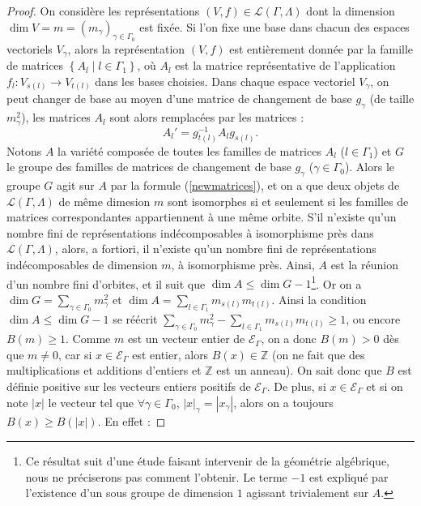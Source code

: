 \documentclass[a4paper,11pt]{article}
\newcommand{\EG}{\mathscr{E}_\Gamma}
\begin{document}
\begin{proof}
	On considère les représentations $(V,f)\in\mathscr L(\Gamma,\Lambda)$ dont la dimension $\dim V=m=(m_\gamma)_{\gamma\in\Gamma_0}$ est fixée. Si l'on fixe une base dans chacun des espaces vectoriels $V_\gamma$, alors la représentation $(V,f)$ est entièrement donnée par la famille de matrices $\left\{ A_l \;|\; l\in\Gamma_1 \right\}$, où $A_l$ est la matrice représentative de l'application $f_l:V_{s(l)}\rightarrow V_{t(l)}$ dans les bases choisies. Dans chaque espace vectoriel $V_\gamma$, on peut changer de base au moyen d'une matrice de changement de base $g_\gamma$ (de taille $m_\gamma^2$), les matrices $A_l$ sont alors remplacées par les matrices :
	\begin{equation}
		A_l'=g_{t(l)}^{-1}A_lg_{s(l)}.
		\label{newmatrices}
	\end{equation}
	Notons $A$ la variété composée de toutes les familles de matrices $A_l$ ($l\in\Gamma_1$) et $G$ le groupe des familles de matrices de changement de base $g_\gamma$ ($\gamma\in\Gamma_0$). Alors le groupe $G$ agit sur $A$ par la formule (\ref{newmatrices}), et on a que deux objets de $\mathscr L(\Gamma,\Lambda)$ de même dimesion $m$ sont isomorphes si et seulement si les familles de matrices correspondantes appartiennent à une même orbite. S'il n'existe qu'un nombre fini de représentations indécomposables à isomorphisme près dans $\mathscr L(\Gamma,\Lambda)$, alors, a fortiori, il n'existe qu'un nombre fini de représentations indécomposables de dimension $m$, à isomorphisme près. Ainsi, $A$ est la réunion d'un nombre fini d'orbites, et il suit que $\dim A\leq\dim G-1$\footnote{Ce résultat suit d'une étude faisant intervenir de la géométrie algébrique, nous ne préciserons pas comment l'obtenir. Le terme $-1$ est expliqué par l'existence d'un sous groupe de dimension $1$ agissant trivialement sur $A$.}. Or on a $\dim G=\sum_{\gamma\in\Gamma_0}m_\gamma^2$ et $\dim A=\sum_{l\in\Gamma_1}m_{s(l)}m_{t(l)}$. Ainsi la condition $\dim A\leq\dim G-1$ se réécrit $\sum_{\gamma\in\Gamma_0}m_\gamma^2-\sum_{l\in\Gamma_1}m_{s(l)}m_{t(l)}\geq 1$, ou encore $B(m)\geq1$. Comme $m$ est un vecteur entier de $\EG$, on a donc $B(m)>0$ dès que $m\neq0$, car si $x\in\EG$ est entier, alors $B(x)\in\mathbb Z$ (on ne fait que des multiplications et additions d'entiers et $\mathbb Z$ est un anneau). On sait donc que $B$ est définie positive sur les vecteurs entiers positifs de $\EG$. De plus, si $x\in\EG$ et si on note $|x|$ le vecteur tel que $\forall\gamma\in\Gamma_0$, $|x|_\gamma=|x_\gamma|$, alors on a toujours $B(x)\geq B(|x|)$. En effet :

\end{proof}
\end{document}
